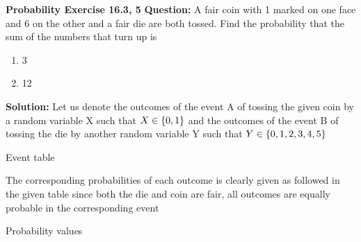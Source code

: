 \documentclass[journal,12pt,twocolumn]{IEEEtran}
\begin{document}
\begin{flushleft}
\textbf{Probability Exercise 16.3, 5}\newline
\textbf{Question:}
A fair coin with 1 marked on one face and 6 on the other and a fair die are both tossed. Find the probability that the sum of the numbers that turn up is 
\begin{enumerate}[label=(\roman{enumi})]
	\item 3
	\item 12
\end{enumerate}
\textbf{Solution:}
Let us denote the outcomes of the event A of tossing the given coin by a random variable X such that $X\in\left\{0, 1\right\}$ and the outcomes of the event B of tossing the die by another random variable Y such that $Y\in\left\{0, 1, 2, 3, 4, 5\right\}$ \newline
\begin{table}[h]
	\centering
	\caption{Event table}
	
\end{table}
The corresponding probabilities of each outcome is clearly given as followed in the given table  since both the die and coin are fair, all outcomes are equally probable in the corresponding event\newline
\begin{table}[h]
	\centering
	\caption{Probability values}
	
\end{table}


\end{flushleft}
\end{document}
